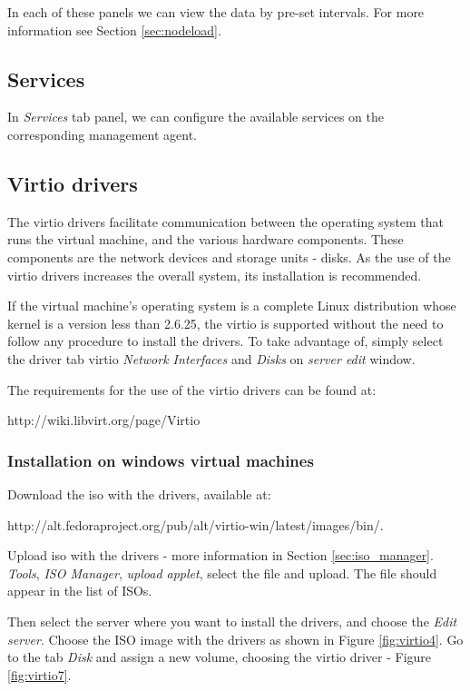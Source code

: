 In each of these panels we can view the data by pre-set intervals. For more information see Section \ref{sec:nodeload}.

\subsection{Services}
In \emph{Services} tab panel, we can configure the available services on the corresponding management agent.

\subsection{Virtio drivers}
The virtio drivers facilitate communication between the operating system that runs the virtual machine, and the various hardware components. These components are the network devices and storage units - disks. As the use of the virtio drivers increases the overall system, its installation is recommended.

If the virtual machine's operating system is a complete Linux distribution whose kernel is a version less than 2.6.25, the virtio is supported without the need to follow any procedure to install the drivers. To take advantage of, simply select the driver tab virtio \textit{Network Interfaces} and \textit{Disks} on \textit{server edit} window.

The requirements for the use of the virtio drivers can be found at:

http://wiki.libvirt.org/page/Virtio

\subsubsection*{Installation on windows virtual machines}

Download the iso with the drivers, available at:

http://alt.fedoraproject.org/pub/alt/virtio-win/latest/images/bin/.

Upload iso with the drivers - more information in Section \ref{sec:iso_manager}. \textit{Tools}, \textit{ISO Manager}, \textit{upload applet}, select the file and upload. The file should appear in the list of ISOs.

Then select the server where you want to install the drivers, and choose the \textit{Edit server}. Choose the ISO image with the drivers as shown in Figure \ref{fig:virtio4}. Go to the tab \textit{Disk} and assign a new volume, choosing the virtio driver - Figure \ref{fig:virtio7}.

